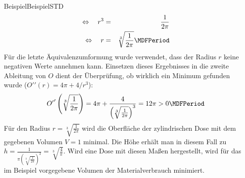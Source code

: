 \begin{MXContent}{Beispiel}{Beispiel}{STD}
\begin{eqnarray*}
\Leftrightarrow\quad r^3 &=& \frac{1}{2\pi}\\
\Leftrightarrow\quad r &=& \sqrt[3]{\frac{1}{2\pi}} \MDFPeriod
\end{eqnarray*}
%
Für die letzte Äquivalenzumformung wurde verwendet, dass der Radius $r$ keine negativen Werte annehmen kann.
Einsetzen dieses Ergebnisses in die zweite Ableitung von $O$  dient der Überprüfung, ob wirklich ein Minimum gefunden wurde
(${O'}'(r) = 4\pi + 4/r^3$):
\begin{eqnarray*}
{O'}'\left(\sqrt[3]{\frac{1}{2\pi}}\right) = 4\pi + \frac{4}{\left(\sqrt[3]{\frac{1}{2\pi}}\right)^3} = 12\pi > 0 \MDFPeriod
\end{eqnarray*}
%
Für den Radius $r = \sqrt[3]{\frac{1}{2\pi}}$ wird die Oberfläche der zylindrischen Dose mit dem gegebenen Volumen $V = 1$ minimal.
Die Höhe erhält man in diesem Fall zu $h = \frac{1}{\pi \left(\sqrt[3]{\frac{1}{2\pi}}\right)^2} = \sqrt[3]{\frac{4}{\pi}}$.
Wird eine Dose mit diesen Maßen hergestellt, wird für das im Beispiel vorgegebene Volumen der Materialverbrauch minimiert.

\end{MXContent}


